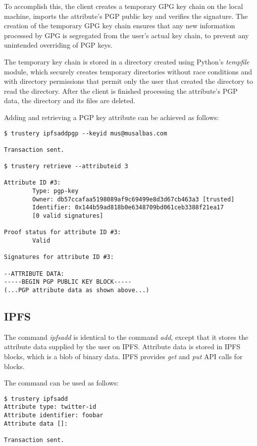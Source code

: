 \documentclass[12pt,a4paper]{report}
\begin{document}
	To accomplish this, the client creates a temporary GPG key chain on the local machine, imports the attribute's PGP public key and verifies the signature. The creation of the temporary GPG key chain ensures that any new information processed by GPG is segregated from the user's actual key chain, to prevent any unintended overriding of PGP keys.
	
	The temporary key chain is stored in a directory created using Python's \textit{tempfile} module, which securely creates temporary directories without race conditions and with directory permissions that permit only the user that created the directory to read the directory. After the client is finished processing the attribute's PGP data, the directory and its files are deleted.
	
	Adding and retrieving a PGP key attribute can be achieved as follows:
	\begin{lstlisting}
$ trustery ipfsaddpgp --keyid mus@musalbas.com

Transaction sent.

$ trustery retrieve --attributeid 3

Attribute ID #3:
        Type: pgp-key
        Owner: db57ccafaa5198089af9c69499e8d3d67cb463a3 [trusted]
        Identifier: 0x144b59ad818b0e6348709bd061ceb3388f21ea17
        [0 valid signatures]

Proof status for attribute ID #3:
        Valid

Signatures for attribute ID #3:

--ATTRIBUTE DATA:
-----BEGIN PGP PUBLIC KEY BLOCK-----
(...PGP attribute data as shown above...)
	\end{lstlisting}
	
	\subsection{IPFS}
	The command \textit{ipfsadd} is identical to the command \textit{add}, except that it stores the attribute data supplied by the user on IPFS. Attribute data is stored in IPFS blocks, which is a blob of binary data. IPFS provides \textit{get} and \textit{put} API calls for blocks.\cite{24}
	
	The command can be used as follows:
	\begin{lstlisting}
$ trustery ipfsadd
Attribute type: twitter-id
Attribute identifier: foobar
Attribute data []: 

Transaction sent.
	\end{lstlisting}
	
\end{document}

